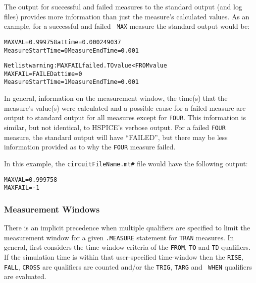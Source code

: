 The output for successful and failed measures to the standard output
(and log files) provides more information than just the measure's
calculated values.  As an example, for a successful and failed {\tt
MAX} measure the standard output would be:

\begin{alltt}
MAXVAL = 0.999758 at time = 0.000249037
Measure Start Time= 0	Measure End Time= 0.001

Netlist warning: MAXFAIL failed. TO value < FROM value
MAXFAIL = FAILED at time = 0
Measure Start Time= 1	Measure End Time= 0.001
\end{alltt}

In general, information on the measurement window, the time(s) that
the measure's value(s) were calculated and a possible cause for a
failed measure are output to standard output for all measures except
for {\tt FOUR}. This information is similar, but not identical, to
HSPICE's verbose output.  For a failed {\tt FOUR} measure, the
standard output will have ``FAILED'', but there may be less
information provided as to why the {\tt FOUR} measure failed.

In this example, the \texttt{circuitFileName.mt\#} file would have the following output:
\begin{alltt}
MAXVAL = 0.999758
MAXFAIL = -1
\end{alltt}

\subsubsection{Measurement Windows}
\label{Measure_Measurement_Windows}
There is an implicit precedence when multiple qualifiers are specified
to limit the measurement window for a given {\tt .MEASURE} statement
for {\tt TRAN} measures.  In general, \Xyce{} first considers the
time-window criteria of the {\tt FROM}, {\tt TO} and {\tt TD}
qualifiers.  If the simulation time is within that user-specified
time-window then the {\tt RISE}, {\tt FALL}, {\tt CROSS} are
qualifiers are counted and/or the {\tt TRIG}, {\tt TARG} and {\tt
WHEN} qualifiers are evaluated.

